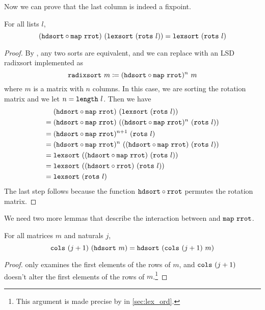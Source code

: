 \documentclass[sigplan,10pt,anonymous,review]{thesis}
\begin{document}
Now we can prove that the last column is indeed a fixpoint.
\begin{theorem}
  For all lists $l$,
  \begin{equation*}
    (\texttt{\textup{hdsort}} \circ
    \texttt{\textup{map}}~\texttt{\textup{rrot}})~(\texttt{\textup{lexsort}}~(\texttt{\textup{rots}}~l)) =
    \texttt{\textup{lexsort}}~(\texttt{\textup{rots}}~l)
  \end{equation*}
\end{theorem}
\begin{proof}
  By , any two sorts are equivalent, and we
  can replace  with an LSD radixsort implemented as
  \begin{equation*}
    \texttt{\textup{radixsort}}~m \coloneqq (\texttt{\textup{hdsort}} \circ \texttt{\textup{map}}~\texttt{\textup{rrot}})^n~m
  \end{equation*}
  where $m$ is a matrix with $n$ columns. In this case, we are sorting
  the rotation matrix and we let $n = \texttt{\textup{length}}~l$. Then we have
  \begin{align*}
       &(\texttt{\textup{hdsort}} \circ \texttt{\textup{map}}~\texttt{\textup{rrot}})~(\texttt{\textup{lexsort}}~(\texttt{\textup{rots}}~l)) \\
    ={}&(\texttt{\textup{hdsort}} \circ \texttt{\textup{map}}~\texttt{\textup{rrot}})~((\texttt{\textup{hdsort}} \circ \texttt{\textup{map}}~\texttt{\textup{rrot}})^n~(\texttt{\textup{rots}}~l)) \\
    ={}&(\texttt{\textup{hdsort}} \circ \texttt{\textup{map}}~\texttt{\textup{rrot}})^{n+1}~(\texttt{\textup{rots}}~l) \\
    ={}&(\texttt{\textup{hdsort}} \circ \texttt{\textup{map}}~\texttt{\textup{rrot}})^n~((\texttt{\textup{hdsort}} \circ \texttt{\textup{map}}~\texttt{\textup{rrot}})~(\texttt{\textup{rots}}~l)) \\
    ={}&\texttt{\textup{lexsort}}~((\texttt{\textup{hdsort}} \circ \texttt{\textup{map}}~\texttt{\textup{rrot}})~(\texttt{\textup{rots}}~l)) \\
    ={}&\texttt{\textup{lexsort}}~((\texttt{\textup{hdsort}} \circ \texttt{\textup{rrot}})~(\texttt{\textup{rots}}~l)) \\
    ={}&\texttt{\textup{lexsort}}~(\texttt{\textup{rots}}~l)
  \end{align*}
  The last step follows because the function $\texttt{\textup{hdsort}} \circ
  \texttt{\textup{rrot}}$ permutes the rotation matrix.
\end{proof}

We need two more lemmas that describe the interaction between
 and $\texttt{\textup{map}}~\texttt{\textup{rrot}}$.

\begin{theorem}
  For all matrices $m$ and naturals $j$,
  \begin{equation*}
    \texttt{\textup{cols}}~(j+1)~(\texttt{\textup{hdsort}}~m) = \texttt{\textup{hdsort}}~(\texttt{\textup{cols}}~(j+1)~m)
  \end{equation*}
\end{theorem}
\begin{proof}
   only examines the first elements of the rows of $m$,
  and $\texttt{\textup{cols}}~(j+1)$ doesn't alter the first elements of the rows
  of $m$.\footnote{This argument is made precise by
     in \cref{sec:lex_ord}.}
\end{proof}
\end{document}
